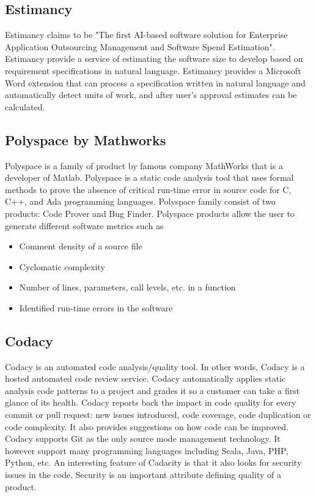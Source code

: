 \documentclass[11pt]{article}
\begin{document}
\subsection{Estimancy}
Estimancy claims to be "The first AI-based software solution for Enterprise Application Outsourcing Management and Software Spend Estimation". Estimancy provide a service of estimating the software size to develop based on requirement specifications in natural language. Estimancy provides a Microsoft Word extension that can process a specification written in natural language and automatically detect units of work, and after user's approval estimates can be calculated.
\subsection{Polyspace by Mathworks}
Polyspace is a family of product by famous company MathWorks that is a developer of Matlab. Polyspace is a static code analysis tool that uses formal methods to prove the absence of critical run-time error in source code for C, C++, and Ada programming languages. Polyspace family consist of two products: Code Prover and Bug Finder.
Polyspace products allow the user to generate different software metrics such as
\begin{itemize}
	\item Comment density of a source file
	\item Cyclomatic complexity
	\item Number of lines, parameters, call levels, etc. in a function
	\item Identified run-time errors in the software
\end{itemize}

\subsection{Codacy}
Codacy is an automated code analysis/quality tool. In other words, Codacy is a hosted automated code review service. 
Codacy automatically applies static analysis code patterns to a project and grades it so a customer can take a first glance of its health. Codacy reports back the impact in code quality for every commit or pull request: new issues introduced, code coverage, code duplication or code complexity. It also provides suggestions on how code can be improved. Codacy supports Git as the only source mode management technology. It however support many programming languages including Scala, Java, PHP, Python, etc. An interesting feature of Cadacity is that it also looks for security issues in the code. Security is an important attribute defining quality of a product.
\end{document}

